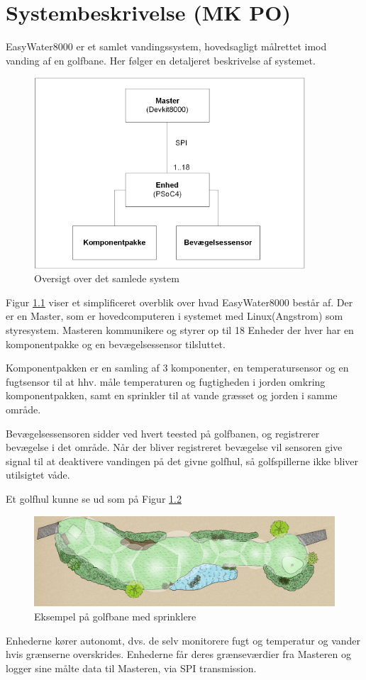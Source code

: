 \chapter{Systembeskrivelse (MK PO)}

EasyWater8000 er et samlet vandingssystem, hovedsagligt målrettet imod vanding af en golfbane. Her følger en detaljeret beskrivelse af systemet.

\begin{figure}[H]
  \centering
    \includegraphics[width=0.9\textwidth]{billeder/systembeskrivelse}
    \caption{Oversigt over det samlede system}
    \label{fig:systembeskrivelse}
\end{figure}

Figur \ref{fig:systembeskrivelse} viser et simplificeret overblik over hvad EasyWater8000 består af. Der er en Master, som er hovedcomputeren i systemet med Linux(Angstrom) som styresystem. Masteren kommunikere og styrer op til 18 Enheder der hver har en komponentpakke og en bevægelsessensor tilsluttet.

Komponentpakken er en samling af 3 komponenter, en temperatursensor og en fugtsensor til at hhv. måle temperaturen og fugtigheden i jorden omkring komponentpakken, samt en sprinkler til at vande græsset og jorden i samme område.

Bevægelsessensoren sidder ved hvert teested på golfbanen, og registrerer bevægelse i det område. Når der bliver registreret bevægelse vil sensoren give signal til at deaktivere vandingen på det givne golfhul, så golfspillerne ikke bliver utilsigtet våde.

Et golfhul kunne se ud som på Figur \ref{fig:hul_med_sprinkler}

\begin{figure}[H]
  \centering
    \includegraphics[width=\textwidth]{billeder/hul_med_sprinkler}
    \caption{Eksempel på golfbane med sprinklere}
    \label{fig:hul_med_sprinkler}
\end{figure}

Enhederne kører autonomt, dvs. de selv monitorere fugt og temperatur og vander hvis grænserne overskrides. Enhederne får deres grænseværdier fra Masteren og logger sine målte data til Masteren, via SPI transmission.